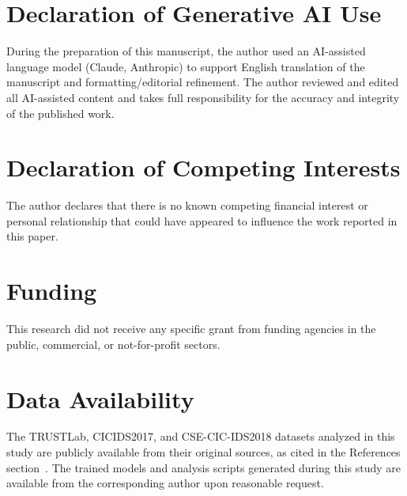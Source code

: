 \documentclass[a4paper,fleqn]{cas-sc}
\begin{document}
\section*{Declaration of Generative AI Use}
During the preparation of this manuscript, the author used an AI-assisted language model (Claude, Anthropic) to support English translation of the manuscript and formatting/editorial refinement. The author reviewed and edited all AI-assisted content and takes full responsibility for the accuracy and integrity of the published work.

\section*{Declaration of Competing Interests}
The author declares that there is no known competing financial interest or personal relationship that could have appeared to influence the work reported in this paper.

\section*{Funding}
This research did not receive any specific grant from funding agencies in the public, commercial, or not-for-profit sectors.

\section*{Data Availability}
The TRUSTLab, CICIDS2017, and CSE-CIC-IDS2018 datasets analyzed in this study are publicly available from their original sources, as cited in the References section~\cite{Villafranca2026,Sharafaldin2018}. The trained models and analysis scripts generated during this study are available from the corresponding author upon reasonable request.



\end{document}
